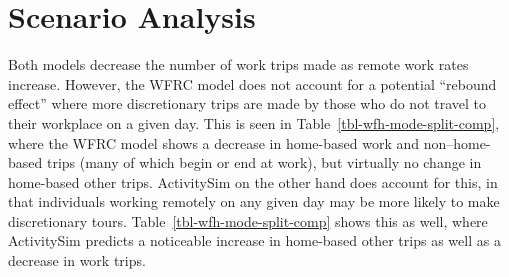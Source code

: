\documentclass[fancy, oneside, mastersfancy, ms]{byuthesis}
\begin{document}
\begin{table}

\caption{\label{tbl-wfh-telecommute}Telecommute Rates and Coefficients
by Job Industry}


\end{table}%

\section{Scenario Analysis}\label{scenario-analysis-2}

Both models decrease the number of work trips made as remote work rates
increase. However, the WFRC model does not account for a potential
``rebound effect'' where more discretionary trips are made by those who
do not travel to their workplace on a given day. This is seen in
Table~\ref{tbl-wfh-mode-split-comp}, where the WFRC model shows a
decrease in home-based work and non--home-based trips (many of which
begin or end at work), but virtually no change in home-based other
trips. ActivitySim on the other hand does account for this, in that
individuals working remotely on any given day may be more likely to make
discretionary tours. Table~\ref{tbl-wfh-mode-split-comp} shows this as
well, where ActivitySim predicts a noticeable increase in home-based
other trips as well as a decrease in work trips.
\end{document}
